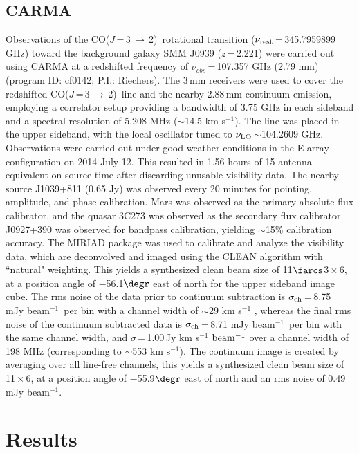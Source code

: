\documentclass[twocolumn,apj,numberedappendix]{emulateapj}
\newcommand{\CO}{\mbox{CO($J$\,=\,3\,$\rightarrow$\,2) }}
\newcommand{\pmOne}{\mbox{$^{-1}$}}
\begin{document}
\subsection{CARMA} \label{sec:carmadata}
Observations of the \CO rotational transition ($\nu_{\rm rest}$\,=\,345.7959899 GHz) toward the background galaxy SMM
J0939 ($z$\,=\,2.221) were carried out using CARMA at a redshifted frequency of $\nu_{obs}$\,=\,107.357\,\,GHz (2.79\,\,mm)  (program ID: cf0142; P.I.: Riechers). The 3\,mm receivers were used to cover the redshifted \CO line and the nearby 2.88\,mm continuum emission, employing a correlator setup providing a bandwidth of 3.75 GHz in each sideband and a spectral resolution of 5.208 MHz ($\sim$14.5 km\,\,s\pmOne). The line was placed in the
upper sideband, with the local oscillator tuned to $\nu_{\rm LO}$\,$\sim$104.2609 GHz.
Observations were carried out under good
weather conditions in the E array configuration on 2014 July 12. This resulted in 1.56 hours of 15 antenna-equivalent on-source time after discarding unusable visibility data.
The nearby source J1039+811 (0.65\,\,Jy) was observed every 20 minutes for
pointing, amplitude, and phase calibration. Mars was observed as the primary
absolute flux calibrator, and the quasar 3C273 was observed as the secondary
flux calibrator. J0927+390 was observed for bandpass calibration, yielding $\sim
$15\% calibration accuracy.
The {\sc MIRIAD} package was used to calibrate and analyze the visibility data, which are deconvolved and imaged using
the CLEAN algorithm with ``natural" weighting. This yields a synthesized clean beam size of 11$\farcs$3\,$\times$\,6, at a position angle of $-$56.1$\degr$ east of north for the upper sideband image cube. 
The rms noise of the data prior to continuum subtraction is $\sigma_{\rm ch}$\,=\,8.75\,\,mJy\,\,beam\pmOne\ per bin 
with a channel width of $\sim$29 km\,\,s\pmOne
, whereas the final rms noise of the continuum subtracted data is $\sigma_{\rm ch}$\,=\,8.71\,\,mJy\,\,beam\pmOne\ per bin with 
the same channel width, and $\sigma$\,=\,1.00\,Jy\,\,km\,\,s\pmOne\,\,$\rm beam^{-1}$ over a channel 
width of 198 MHz (corresponding to $\sim$553\,\,km\,\,s\pmOne). 
The continuum image is created by
averaging over all line-free channels, this yields a synthesized clean beam size of 11\,$\times$\,6, at a position angle of $-$55.9$\degr$ east of north and an 
rms noise of 0.49\,\,mJy\,\,beam\pmOne.

\section{Results}\label{sec:res}
\end{document}
